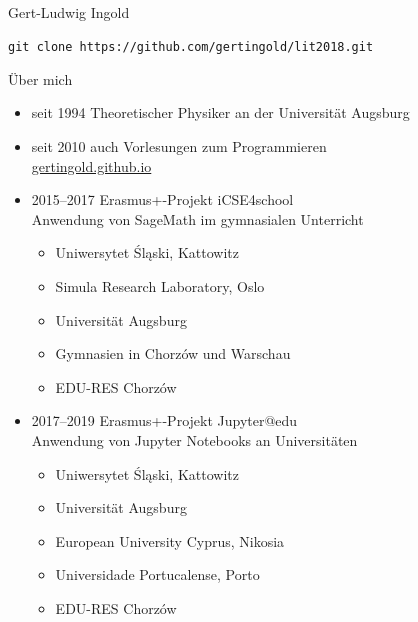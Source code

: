 \documentclass[t, utf8, 10pt]{beamer}
\begin{document}
\begin{frame}
 \vspace{4truecm}
 \begin{center}
  \\[0.3truecm]
  {\large Gert-Ludwig Ingold}

  \vspace{2truecm}
  \texttt{\normalsize git clone https://github.com/gertingold/lit2018.git}
 \end{center}
\end{frame}

\begin{frame}{Über mich}
 \begin{itemize}
  \item seit 1994 Theoretischer Physiker an der Universität Augsburg
  \item seit 2010 auch Vorlesungen zum Programmieren\\
	\url{gertingold.github.io}
  \item 2015--2017 Erasmus+-Projekt iCSE4school\quad
        \\
	Anwendung von SageMath im gymnasialen Unterricht
        \begin{itemize}
	 \item Uniwersytet Śląski, Kattowitz
	 \item Simula Research Laboratory, Oslo
	 \item Universität Augsburg
	 \item Gymnasien in Chorzów und Warschau
	 \item EDU-RES Chorzów
	\end{itemize}
  \item 2017--2019 Erasmus+-Projekt Jupyter@edu\quad
        \\
	Anwendung von Jupyter Notebooks an Universitäten
        \begin{itemize}
	 \item Uniwersytet Śląski, Kattowitz
	 \item Universität Augsburg
         \item European University Cyprus, Nikosia
	 \item Universidade Portucalense, Porto
	 \item EDU-RES Chorzów
	\end{itemize}
 \end{itemize}
\end{frame}
\end{document}
